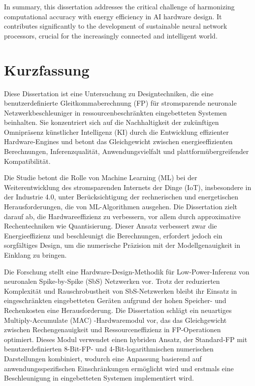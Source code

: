 \documentclass{article}
\begin{document}
	In summary, this dissertation addresses the critical challenge of harmonizing computational accuracy with energy efficiency in AI hardware design. It contributes significantly to the development of sustainable neural network processors, crucial for the increasingly connected and intelligent world.
	
	\newpage
	\section*{Kurzfassung}

	Diese Dissertation ist eine Untersuchung zu Designtechniken, die eine benutzerdefinierte Gleitkommaberechnung (FP) für stromsparende neuronale Netzwerkbeschleuniger in ressourcenbeschränkten eingebetteten Systemen beinhalten. Sie konzentriert sich auf die Nachhaltigkeit der zukünftigen Omnipräsenz künstlicher Intelligenz (KI) durch die Entwicklung effizienter Hardware-Engines und betont das Gleichgewicht zwischen energieeffizienten Berechnungen, Inferenzqualität, Anwendungsvielfalt und plattformübergreifender Kompatibilität.
	
	Die Studie betont die Rolle von Machine Learning (ML) bei der Weiterentwicklung des stromsparenden Internets der Dinge (IoT), insbesondere in der Industrie 4.0, unter Berücksichtigung der rechnerischen und energetischen Herausforderungen, die von ML-Algorithmen ausgehen. Die Dissertation zielt darauf ab, die Hardwareeffizienz zu verbessern, vor allem durch approximative Rechentechniken wie Quantisierung. Dieser Ansatz verbessert zwar die Energieeffizienz und beschleunigt die Berechnungen, erfordert jedoch ein sorgfältiges Design, um die numerische Präzision mit der  Modellgenauigkeit in Einklang zu bringen.
	
	Die Forschung stellt eine Hardware-Design-Methodik für Low-Power-Inferenz von neuronalen Spike-by-Spike (SbS) Netzwerken vor. Trotz der reduzierten Komplexität und Rauschrobustheit von SbS-Netzwerken bleibt ihr Einsatz in eingeschränkten eingebetteten Geräten aufgrund der hohen Speicher- und Rechenkosten eine Herausforderung. Die Dissertation schlägt ein neuartiges Multiply-Accumulate (MAC) -Hardwaremodul vor, das das Gleichgewicht zwischen Rechengenauigkeit und Ressourceneffizienz in FP-Operationen optimiert. Dieses Modul verwendet einen hybriden Ansatz, der Standard-FP mit benutzerdefinierten 8-Bit-FP- und 4-Bit-logarithmischen numerischen Darstellungen kombiniert, wodurch eine Anpassung basierend auf anwendungsspezifischen Einschränkungen ermöglicht wird und erstmals eine Beschleunigung in eingebetteten Systemen implementiert wird.
	
\end{document}
